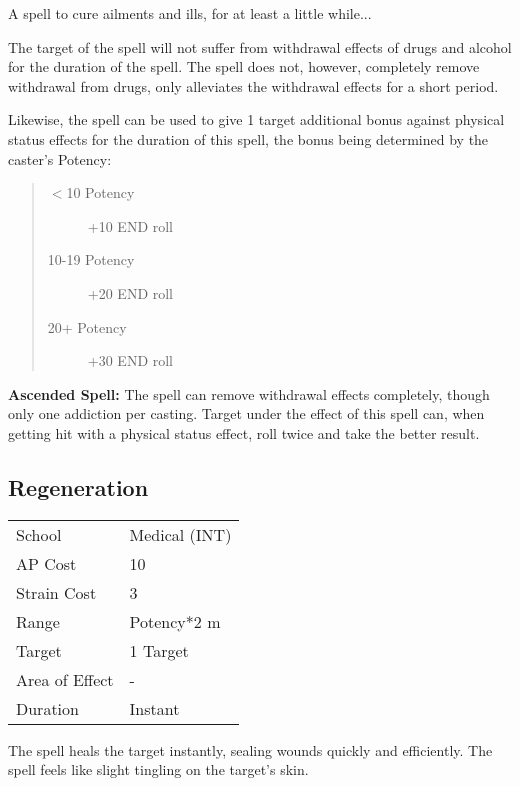 \documentclass[11pt,a4paper,twocolumn]{book}
\begin{document}
\medskip
A spell to cure ailments and ills, for at least a little while...

The target of the spell will not suffer from withdrawal effects of drugs and alcohol for the duration of the spell. The spell does not, however, completely remove withdrawal from drugs, only alleviates the withdrawal effects for a short period.

Likewise, the spell can be used to give 1 target additional bonus against physical status effects for the duration of this spell, the bonus being determined by the caster's Potency:

\begin{quote}
	\begin{description}
		\item[$<$10 Potency] 	+10 END roll
		\item[10-19 Potency] 	+20 END roll
		\item[20+ Potency] 	    +30 END roll
	\end{description}
\end{quote}

\bigskip

\textbf{Ascended Spell:} The spell can remove withdrawal effects completely, though only one addiction per casting. Target under the effect of this spell can, when getting hit with a physical status effect, roll twice and take the better result.


\subsection*{Regeneration}
{
	\begin{tabu} to 75mm{| X[l,4] | X[l,7] |}
		\hline
		School 			& Medical (INT) 		\\
		AP Cost	      	& 10 					\\
		Strain Cost     & 3 					\\
		Range     		& Potency*2	m			\\
		Target      	& 1 Target				\\
		Area of Effect  & -  	 				\\
		Duration     	& Instant				\\ \hline
	\end{tabu}
	
}

\medskip

The spell heals the target instantly, sealing wounds quickly and efficiently. The spell feels like slight tingling on the target's skin.
\end{document}
